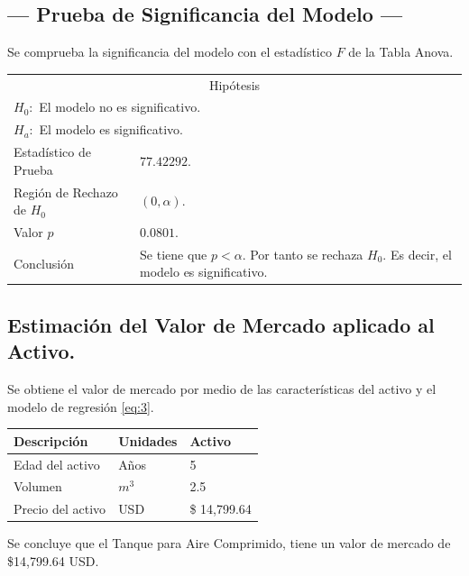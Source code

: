 \subsection{\centering --- Prueba de Significancia del Modelo ---} %
Se comprueba la significancia del modelo con el estadístico \(F\) de la Tabla Anova.
\begin{center}
  \begin{tabular}{|l|p{6cm}|}
    \cline{1-2}
    \multicolumn{2}{|c|}{Hipótesis}\\ \cline{1-2}
    \multicolumn{2}{|l|}{\(H_0:\) El modelo no es significativo.} \\ 
    \multicolumn{2}{|l|}{\(H_a:\) El modelo es significativo.} \\ \cline{1-2}
    Estadístico de Prueba & \(77.42292\).\\ \cline{1-2} 
		Región de Rechazo de \(H_0\) & \((0, \alpha )\).\\ \cline{1-2} 
    Valor \(p\) & \(0.0801\).\\ \cline{1-2} 
    Conclusión & Se tiene que \(p<\alpha\). \newline 
		Por tanto se rechaza \(H_0\). \newline 
		Es decir, el modelo es significativo.\\ \cline{1-2} 
  \end{tabular}
\end{center} 

\subsection{\centering Estimación del Valor de Mercado aplicado al Activo.} %
Se obtiene el valor de mercado por medio de las características del activo y el modelo de regresión \eqref{eq:3}.
\begin{center}
  \begin{tabular}{|l|l|l|}
    \hline 
		Descripción   & Unidades  & Activo \\ \hline 
    Edad del activo    & Años      & 5      \\ \hline 
		Volumen  & \(m ^ 3\) & 2.5   \\ \hline 
		Precio del activo   & USD       & \$ 14,799.64 \\ \hline 
  \end{tabular}
\end{center} 
Se concluye que el Tanque para Aire Comprimido, tiene un valor de mercado de 
\$14,799.64 USD.


